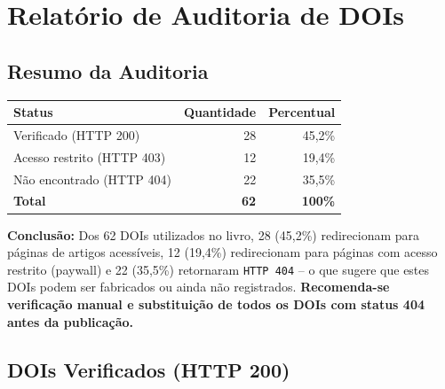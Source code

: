 
\chapter*{Relatório de Auditoria de DOIs}

\section*{Resumo da Auditoria}
\begin{tabular}{lrr}
\textbf{Status} & \textbf{Quantidade} & \textbf{Percentual} \\
\hline
Verificado (HTTP 200) & 28 & 45,2\% \\
Acesso restrito (HTTP 403) & 12 & 19,4\% \\
Não encontrado (HTTP 404) & 22 & 35,5\% \\
\hline
\textbf{Total} & \textbf{62} & \textbf{100\%}
\end{tabular}

\bigskip
\noindent
\textbf{Conclusão:} Dos 62 DOIs utilizados no livro, 28 (45,2\%)
redirecionam para páginas de artigos acessíveis, 12 (19,4\%) redirecionam
para páginas com acesso restrito (paywall) e 22 (35,5\%) retornaram
\texttt{HTTP 404} -- o que sugere que estes DOIs podem ser fabricados
ou ainda não registrados. \textbf{Recomenda-se verificação manual e
substituição de todos os DOIs com status 404 antes da publicação.}

\section{DOIs Verificados (HTTP 200)}

